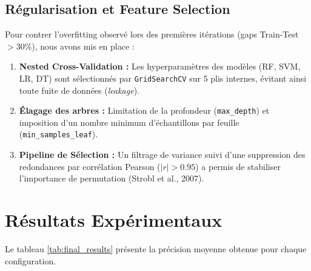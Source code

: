 \documentclass[a4paper,11pt]{article}
\begin{document}
\subsection{Régularisation et Feature Selection}
Pour contrer l'overfitting observé lors des premières itérations (gaps Train-Test $> 30\%$), nous avons mis en place :
\begin{enumerate}
    \item \textbf{Nested Cross-Validation :} Les hyperparamètres des modèles (RF, SVM, LR, DT) sont sélectionnés par \texttt{GridSearchCV} sur 5 plis internes, évitant ainsi toute fuite de données (\textit{leakage}).
    \item \textbf{Élagage des arbres :} Limitation de la profondeur (\texttt{max\_depth}) et imposition d'un nombre minimum d'échantillons par feuille (\texttt{min\_samples\_leaf}).
    \item \textbf{Pipeline de Sélection :} Un filtrage de variance suivi d'une suppression des redondances par corrélation Pearson ($|r| > 0.95$) a permis de stabiliser l'importance de permutation (Strobl et al., 2007).
\end{enumerate}

\section{Résultats Expérimentaux}

Le tableau \ref{tab:final_results} présente la précision moyenne obtenue pour chaque configuration.

\begin{table}[H]
\centering
\caption{Performances finales (Accuracy $\pm$ Std). Sélection automatique du meilleur prétraitement par méthode.}
\label{tab:final_results}
\end{table}
\end{document}
